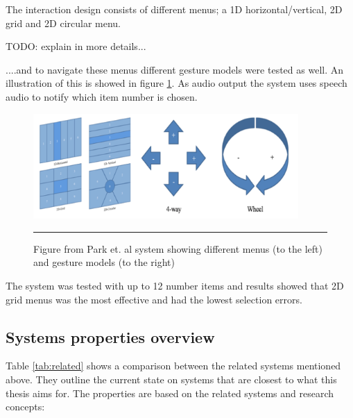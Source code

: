 The interaction design consists of different menus; a 1D horizontal/vertical, 2D grid and 2D circular menu.

TODO: explain in more details...

....and to navigate these menus different gesture models were tested as well. An illustration of this is showed in figure \ref{fig:park-menus}. As audio output the system uses speech audio to notify which item number is chosen.

\begin{figure}[t]
	\centering
		\includegraphics[width=0.9\textwidth,height=\textheight,keepaspectratio]{./Figures/park-menus.png}
		\rule{35em}{0.5pt}
	\caption[Park menus]{Figure from Park et. al \cite{park_gaze-directed_2011} system showing different menus (to the left) and gesture models (to the right)}
	\label{fig:park-menus}
\end{figure}

The system was tested with up to 12 number items and results showed that 2D grid menus was the most effective and had the lowest selection errors.


\subsection{Systems properties overview}
Table \ref{tab:related} shows a comparison between the related systems mentioned above. They outline the current state on systems that are closest to what this thesis aims for. The properties are based on the related systems and research concepts:

